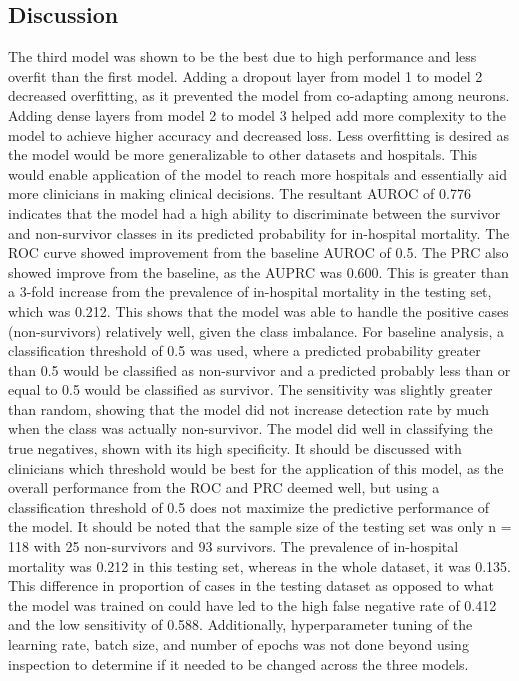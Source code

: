 \documentclass[10pt]{article}
\begin{document}
\begin{multicols}{2}
\section{Discussion}
The third model was shown to be the best due to high performance and less overfit than the first model. Adding a dropout layer from model 1 to model 2 decreased overfitting, as it prevented the model from co-adapting among neurons. Adding dense layers from model 2 to model 3 helped add more complexity to the model to achieve higher accuracy and decreased loss. Less overfitting is desired as the model would be more generalizable to other datasets and hospitals. This would enable application of the model to reach more hospitals and essentially aid more clinicians in making clinical decisions. The resultant AUROC of 0.776 indicates that the model had a high ability to discriminate between the survivor and non-survivor classes in its predicted probability for in-hospital mortality. The ROC curve showed improvement from the baseline AUROC of 0.5. The PRC also showed improve from the baseline, as the AUPRC was 0.600. This is greater than a 3-fold increase from the prevalence of in-hospital mortality in the testing set, which was 0.212. This shows that the model was able to handle the positive cases (non-survivors) relatively well, given the class imbalance. For baseline analysis, a classification threshold of 0.5 was used, where a predicted probability greater than 0.5 would be classified as non-survivor and a predicted probably less than or equal to 0.5 would be classified as survivor. The sensitivity was slightly greater than random, showing that the model did not increase detection rate by much when the class was actually non-survivor. The model did well in classifying the true negatives, shown with its high specificity. It should be discussed with clinicians which threshold would be best for the application of this model, as the overall performance from the ROC and PRC deemed well, but using a classification threshold of 0.5 does not maximize the predictive performance of the model. It should be noted that the sample size of the testing set was only n = 118 with 25 non-survivors and 93 survivors. The prevalence of in-hospital mortality was 0.212 in this testing set, whereas in the whole dataset, it was 0.135. This difference in proportion of cases in the testing dataset as opposed to what the model was trained on could have led to the high false negative rate of 0.412 and the low sensitivity of 0.588. Additionally, hyperparameter tuning of the learning rate, batch size, and number of epochs was not done beyond using inspection to determine if it needed to be changed across the three models.


\end{multicols}
\end{document}
